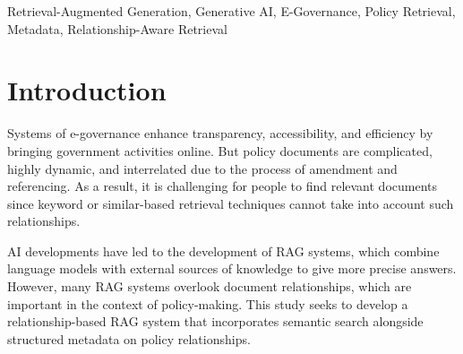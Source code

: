 \documentclass[conference]{IEEEtran}
\begin{document}
\begin{abstract}
The government policies are living documents that are subject to change. Keyword-based searching and traditional RAG approaches will not work in connecting bits and pieces within the document, which includes amendments, references, previous mentions, and others. In consequence, one searching for some policy information can get outdated information and not see the whole picture. This creates a higher chance for mistakes to happen in AI-supported applications used by the citizens.

This project proposes a Relationship-Aware RAG-based Generative AI framework. It models clear relationships between policy documents, including version history, amendment chains, and cross-references. Instead of fetching independent text chunks, the system builds a structured relationship graph that links original policies with their updates and related sections. During query processing, the retrieval module focuses on legally valid versions and adds context from connected documents before sending the information to the Large Language Model (LLM).

By combining relationship-aware retrieval methods, the proposed framework greatly improves policy correctness, contextual completeness, and response reliability. This method lowers the risk of misinformation and boosts trust in AI-driven e-governance systems. It ensures that citizens get legally valid, up-to-date, and contextually consistent policy guidance.
\end{abstract}

\begin{IEEEkeywords}
Retrieval-Augmented Generation, Generative AI, E-Governance, Policy Retrieval, Metadata, Relationship-Aware Retrieval
\end{IEEEkeywords}

\section{Introduction}
Systems of e-governance enhance transparency, accessibility, and efficiency by bringing government activities online. But policy documents are complicated, highly dynamic, and interrelated due to the process of amendment and referencing. As a result, it is challenging for people to find relevant documents since keyword or similar-based retrieval techniques cannot take into account such relationships.

AI developments have led to the development of RAG systems, which combine language models with external sources of knowledge to give more precise answers. However, many RAG systems overlook document relationships, which are important in the context of policy-making. This study seeks to develop a relationship-based RAG system that incorporates semantic search alongside structured metadata on policy relationships.
\end{document}
